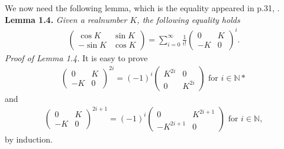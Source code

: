 \documentclass[a4paper]{article}
\numberwithin{equation}{section}
\begin{document}
We now need the following lemma, which is the equality appeared in p.31, \cite{1}. 
\\
\textbf{Lemma 1.4.} \textit{Given a realnumber $K$, the following equality holds}
\begin{align}
\label{1.21}
\left( {\begin{array}{*{20}{c}}
{\cos K}&{\sin K}\\
{ - \sin K}&{\cos K}
\end{array}} \right) = \sum\limits_{i = 0}^\infty  {\frac{1}{{i!}}{{\left( {\begin{array}{*{20}{c}}
0&K\\
{ - K}&0
\end{array}} \right)}^i}} .
\end{align}
\textit{Proof of Lemma 1.4.} It is easy to prove 
\begin{align}
\label{1.22}
{\left( {\begin{array}{*{20}{c}}
0&K\\
{ - K}&0
\end{array}} \right)^{2i}} = {\left( { - 1} \right)^i}\left( {\begin{array}{*{20}{c}}
{{K^{2i}}}&0\\
0&{{K^{2i}}}
\end{array}} \right)\mbox{ for } i \in {\mathbb{N}*}
\end{align}
and
\begin{align}
\label{1.23}
{\left( {\begin{array}{*{20}{c}}
0&K\\
{ - K}&0
\end{array}} \right)^{2i + 1}} = {\left( { - 1} \right)^i}\left( {\begin{array}{*{20}{c}}
0&{{K^{2i + 1}}}\\
{ - {K^{2i + 1}}}&0
\end{array}} \right)\mbox{ for } i \in \mathbb{N},
\end{align}
by induction.
\end{document}
